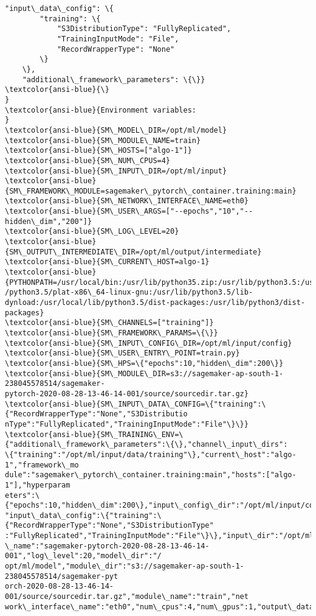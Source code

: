 \documentclass[11pt]{article}
\begin{document}
\begin{Verbatim}[commandchars=\\\{\}]
    "input\_data\_config": \{
        "training": \{
            "S3DistributionType": "FullyReplicated",
            "TrainingInputMode": "File",
            "RecordWrapperType": "None"
        \}
    \},
    "additional\_framework\_parameters": \{\}}
\textcolor{ansi-blue}{\}
}
\textcolor{ansi-blue}{Environment variables:
}
\textcolor{ansi-blue}{SM\_MODEL\_DIR=/opt/ml/model}
\textcolor{ansi-blue}{SM\_MODULE\_NAME=train}
\textcolor{ansi-blue}{SM\_HOSTS=["algo-1"]}
\textcolor{ansi-blue}{SM\_NUM\_CPUS=4}
\textcolor{ansi-blue}{SM\_INPUT\_DIR=/opt/ml/input}
\textcolor{ansi-blue}{SM\_FRAMEWORK\_MODULE=sagemaker\_pytorch\_container.training:main}
\textcolor{ansi-blue}{SM\_NETWORK\_INTERFACE\_NAME=eth0}
\textcolor{ansi-blue}{SM\_USER\_ARGS=["--epochs","10","--hidden\_dim","200"]}
\textcolor{ansi-blue}{SM\_LOG\_LEVEL=20}
\textcolor{ansi-blue}{SM\_OUTPUT\_INTERMEDIATE\_DIR=/opt/ml/output/intermediate}
\textcolor{ansi-blue}{SM\_CURRENT\_HOST=algo-1}
\textcolor{ansi-blue}{PYTHONPATH=/usr/local/bin:/usr/lib/python35.zip:/usr/lib/python3.5:/usr/lib
/python3.5/plat-x86\_64-linux-gnu:/usr/lib/python3.5/lib-
dynload:/usr/local/lib/python3.5/dist-packages:/usr/lib/python3/dist-
packages}
\textcolor{ansi-blue}{SM\_CHANNELS=["training"]}
\textcolor{ansi-blue}{SM\_FRAMEWORK\_PARAMS=\{\}}
\textcolor{ansi-blue}{SM\_INPUT\_CONFIG\_DIR=/opt/ml/input/config}
\textcolor{ansi-blue}{SM\_USER\_ENTRY\_POINT=train.py}
\textcolor{ansi-blue}{SM\_HPS=\{"epochs":10,"hidden\_dim":200\}}
\textcolor{ansi-blue}{SM\_MODULE\_DIR=s3://sagemaker-ap-south-1-238045578514/sagemaker-
pytorch-2020-08-28-13-46-14-001/source/sourcedir.tar.gz}
\textcolor{ansi-blue}{SM\_INPUT\_DATA\_CONFIG=\{"training":\{"RecordWrapperType":"None","S3Distributio
nType":"FullyReplicated","TrainingInputMode":"File"\}\}}
\textcolor{ansi-blue}{SM\_TRAINING\_ENV=\{"additional\_framework\_parameters":\{\},"channel\_input\_dirs":
\{"training":"/opt/ml/input/data/training"\},"current\_host":"algo-1","framework\_mo
dule":"sagemaker\_pytorch\_container.training:main","hosts":["algo-1"],"hyperparam
eters":\{"epochs":10,"hidden\_dim":200\},"input\_config\_dir":"/opt/ml/input/config",
"input\_data\_config":\{"training":\{"RecordWrapperType":"None","S3DistributionType"
:"FullyReplicated","TrainingInputMode":"File"\}\},"input\_dir":"/opt/ml/input","job
\_name":"sagemaker-pytorch-2020-08-28-13-46-14-001","log\_level":20,"model\_dir":"/
opt/ml/model","module\_dir":"s3://sagemaker-ap-south-1-238045578514/sagemaker-pyt
orch-2020-08-28-13-46-14-001/source/sourcedir.tar.gz","module\_name":"train","net
work\_interface\_name":"eth0","num\_cpus":4,"num\_gpus":1,"output\_data\_dir":"/opt/ml

\end{Verbatim}
\end{document}
